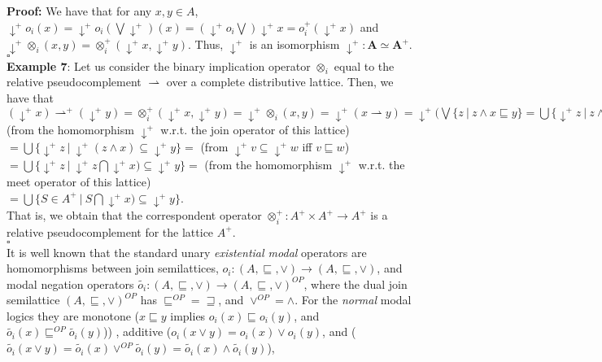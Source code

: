 \documentclass[10pt,twocolumn]{article}
\begin{document}
\textbf{Proof:} We have that for any $x,y \in A$, $\downarrow^+
o_i(x) = \downarrow^+ o_i ( \bigvee \downarrow^+)(x) = (\downarrow^+
o_i  \bigvee) \downarrow^+ x = o^+_i (\downarrow^+ x)$ and
$\downarrow^+ \otimes_i(x,y) = \otimes^+_i (\downarrow^+ x,
\downarrow^+ y)$. Thus, $\downarrow^+$ is an isomorphism
$\downarrow^+: \textbf{A} \simeq \textbf{A}^+$. \\ $\square$ \\
\textbf{Example 7}: Let us consider the binary implication operator
$\otimes_i$ equal to the relative pseudocomplement $\rightharpoonup$
over a complete distributive lattice. Then, we have that
$(\downarrow^+ x) \rightharpoonup^+ (\downarrow^+ y) = \otimes^+_i
(\downarrow^+ x, \downarrow^+ y) = \downarrow^+ \otimes_i(x,y) =
\downarrow^+(x\rightharpoonup y) = \downarrow^+ (\bigvee\{z~|~z
\wedge x \sqsubseteq y\} = \bigcup \{\downarrow^+ z~|~z \wedge x
\sqsubseteq y\} = $ (from the homomorphism $\downarrow^+ $ w.r.t.
the join operator of this lattice)\\ $ = \bigcup \{\downarrow^+
z~|~\downarrow^+(z \wedge x) \subseteq \downarrow^+ y\} = $ (from
$\downarrow^+v \subseteq \downarrow^+w$ iff $v \sqsubseteq w$)\\ $ =
\bigcup \{\downarrow^+ z~|~\downarrow^+ z \bigcap \downarrow^+ x)
\subseteq \downarrow^+ y\} = $ (from the homomorphism $\downarrow^+
$ w.r.t. the meet operator of this lattice)\\ $ = \bigcup \{S \in
A^+~|~S \bigcap \downarrow^+ x) \subseteq \downarrow^+ y\} $. \\That
is, we obtain that the correspondent operator $\otimes^+_i:A^+
\times A^+ \rightarrow  A^+$ is a relative pseudocomplement for the
lattice $A^+$.
\\ $\square$ \\
It is well known that the standard unary \emph{existential modal}
operators are homomorphisms between join semilattices,
$o_i:(A,\sqsubseteq, \vee) \rightarrow (A,\sqsubseteq, \vee)$, and
modal negation operators $\widetilde{o_i}:(A,\sqsubseteq, \vee)
\rightarrow (A,\sqsubseteq, \vee)^{OP}$, where the dual join
semilattice $(A,\sqsubseteq, \vee)^{OP}$ has $\sqsubseteq^{OP} =
\sqsupseteq$, and $\vee^{OP} = \wedge$. For the \emph{normal} modal
logics they are monotone ($x\sqsubseteq y$ implies
$o_i(x)\sqsubseteq o_i(y)$, and $\widetilde{o_i}(x)\sqsubseteq^{OP}
\widetilde{o_i}(y)$)) , additive ($o_i(x \vee y) = o_i(x) \vee
o_i(y)$, and ($\widetilde{o_i}(x \vee y) = \widetilde{o_i}(x)
\vee^{OP} \widetilde{o_i}(y) = \widetilde{o_i}(x) \wedge
\widetilde{o_i}(y)$),
\end{document}
